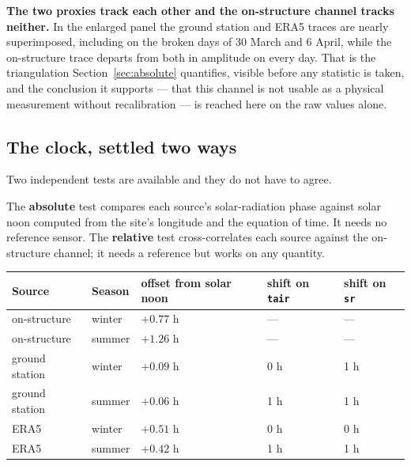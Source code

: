\documentclass[11pt,a4paper]{article}
\begin{document}
\textbf{The two proxies track each other and the on-structure channel tracks
neither.} In the enlarged panel the ground station and ERA5 traces are nearly
superimposed, including on the broken days of 30 March and 6 April, while the
on-structure trace departs from both in amplitude on every day. That is the
triangulation Section~\ref{sec:absolute} quantifies, visible before any statistic
is taken, and the conclusion it supports --- that this channel is not usable as a
physical measurement without recalibration --- is reached here on the raw values
alone.

\subsection{The clock, settled two ways}

Two independent tests are available and they do not have to agree.

The \textbf{absolute} test compares each source's solar-radiation phase against
solar noon computed from the site's longitude and the equation of time. It needs
no reference sensor. The \textbf{relative} test cross-correlates each source
against the on-structure channel; it needs a reference but works on any quantity.

\begin{center}
\small
\begin{tabular}{llR{1.9cm}R{1.9cm}R{1.9cm}}
\toprule
\textbf{Source} & \textbf{Season} & \textbf{offset from solar noon} &
\textbf{shift on \texttt{tair}} & \textbf{shift on \texttt{sr}} \\
\midrule
on-structure   & winter & $+0.77$ h & --- & --- \\
on-structure   & summer & $+1.26$ h & --- & --- \\
ground station & winter & $+0.09$ h & 0 h & 1 h \\
ground station & summer & $+0.06$ h & 1 h & 1 h \\
ERA5           & winter & $+0.51$ h & 0 h & 0 h \\
ERA5           & summer & $+0.42$ h & 1 h & 1 h \\
\bottomrule
\end{tabular}
\end{center}
\end{document}
